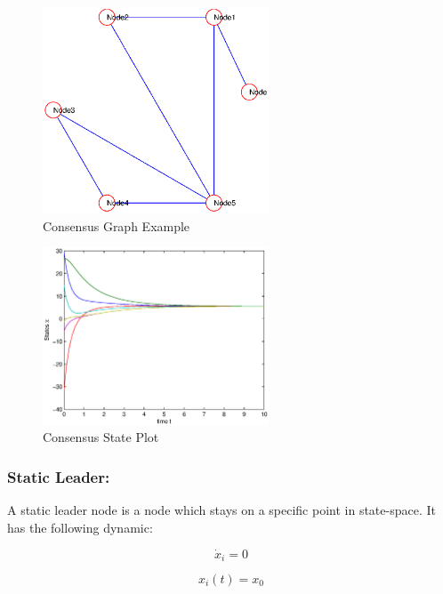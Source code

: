 \documentclass[a4paper,twoside, openright,12pt]{report}
\begin{document}
\begin{figure}[htb]
\centering
\includegraphics[width=0.6\textwidth]{pics/consensus_graph.eps}
\caption[Consensus Graph Example]{Consensus Graph Example}
\label{ConsensusGraphFig}
\end{figure}

\begin{figure}[htb]
\centering
\includegraphics[width=0.6\textwidth]{pics/consensus_fig.eps}
\caption[Consensus State Plot]{Consensus State Plot}
\label{ConsensusStatePlotFig}
\end{figure}
\pagebreak

\subsubsection{Static Leader:}

A static leader node is a node which stays on a specific point in state-space.
It has the following dynamic:

\begin{equation}
\dot{x}_i = 0
\end{equation}

\begin{equation}
  x_i(t) = x_0
\end{equation}
\end{document}
